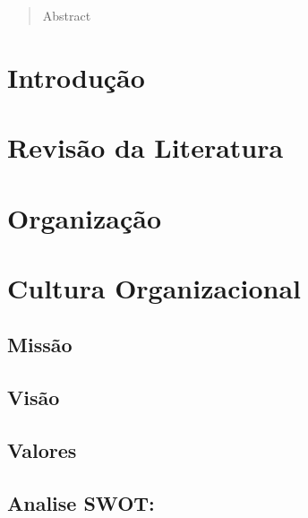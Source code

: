 

\tableofcontents
\appendix
\pagestyle{plain} %
\setlength{\parindent}{0in}
\label{Resumo}
\begin{abstract}
Abstract
\end{abstract}
\newpage
\section{Introdução}
\newpage
\section{Revisão da Literatura}
\section{Organização}
\section{Cultura Organizacional}
\subsection{Missão}
\subsection{Visão}
\subsection{Valores}
\subsection{Analise SWOT:}
